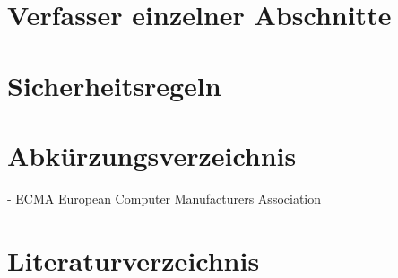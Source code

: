 \documentclass[11pt,a4paper]{article}
\begin{document}
\appendix
\section{Verfasser einzelner Abschnitte}

\clearpage
\section{Sicherheitsregeln}

\clearpage

\section*{Abkürzungsverzeichnis}

- ECMA European Computer Manufacturers Association 

\newpage

\section*{Literaturverzeichnis}
\end{document}
